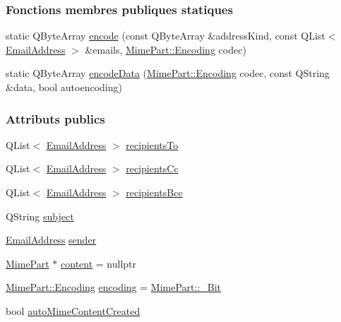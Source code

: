 \subsubsection*{Fonctions membres publiques statiques}
\begin{DoxyCompactItemize}
\item 
static Q\+Byte\+Array \hyperlink{class_simple_mail_1_1_mime_message_private_a44bd454950e1fd6b48a29d2a7b11ca33}{encode} (const Q\+Byte\+Array \&address\+Kind, const Q\+List$<$ \hyperlink{class_simple_mail_1_1_email_address}{Email\+Address} $>$ \&emails, \hyperlink{class_simple_mail_1_1_mime_part_ae67a2f5406958b95b18bf31a7bbeb5c9}{Mime\+Part\+::\+Encoding} codec)
\item 
static Q\+Byte\+Array \hyperlink{class_simple_mail_1_1_mime_message_private_ae036b2417205ef25181091bebd15c0f6}{encode\+Data} (\hyperlink{class_simple_mail_1_1_mime_part_ae67a2f5406958b95b18bf31a7bbeb5c9}{Mime\+Part\+::\+Encoding} codec, const Q\+String \&data, bool autoencoding)
\end{DoxyCompactItemize}
\subsubsection*{Attributs publics}
\begin{DoxyCompactItemize}
\item 
Q\+List$<$ \hyperlink{class_simple_mail_1_1_email_address}{Email\+Address} $>$ \hyperlink{class_simple_mail_1_1_mime_message_private_a5bfd71b52877cc613eec44eefb12c3a1}{recipients\+To}
\item 
Q\+List$<$ \hyperlink{class_simple_mail_1_1_email_address}{Email\+Address} $>$ \hyperlink{class_simple_mail_1_1_mime_message_private_a5aa4769d23ba5936729d048198c0d506}{recipients\+Cc}
\item 
Q\+List$<$ \hyperlink{class_simple_mail_1_1_email_address}{Email\+Address} $>$ \hyperlink{class_simple_mail_1_1_mime_message_private_a902b57c4d792727c2b549f7650e18cce}{recipients\+Bcc}
\item 
Q\+String \hyperlink{class_simple_mail_1_1_mime_message_private_a75a861cd7e4544d55fa7e452b65f30a2}{subject}
\item 
\hyperlink{class_simple_mail_1_1_email_address}{Email\+Address} \hyperlink{class_simple_mail_1_1_mime_message_private_a88f1454bf5198c4ae9a30b2ae8284138}{sender}
\item 
\hyperlink{class_simple_mail_1_1_mime_part}{Mime\+Part} $\ast$ \hyperlink{class_simple_mail_1_1_mime_message_private_a31f25b224455b2e8dafbdc1d6cfed3de}{content} = nullptr
\item 
\hyperlink{class_simple_mail_1_1_mime_part_ae67a2f5406958b95b18bf31a7bbeb5c9}{Mime\+Part\+::\+Encoding} \hyperlink{class_simple_mail_1_1_mime_message_private_a5b1a44483253f33a7e042431ce3ad105}{encoding} = \hyperlink{class_simple_mail_1_1_mime_part_ae67a2f5406958b95b18bf31a7bbeb5c9a27c1574a6fe2fa936ae6cfe9654bb37f}{Mime\+Part\+::\+\_\+Bit}
\item 
bool \hyperlink{class_simple_mail_1_1_mime_message_private_ac1fc811c2963e2b2027396a86a7257e6}{auto\+Mime\+Content\+Created}
\end{DoxyCompactItemize}


